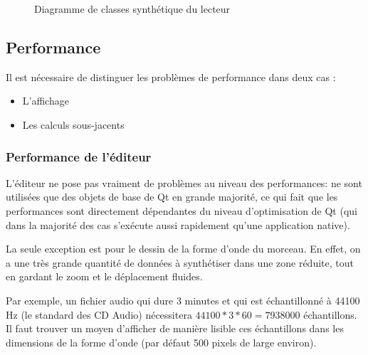 \begin{figure}[H]
\begin{center}
\caption{Diagramme de classes synthétique du lecteur}
\label{diag_player}
\end{center}
\end{figure}

\subsection{Performance}
Il est nécessaire de distinguer les problèmes de performance dans deux cas :

\begin{itemize}
	\item L'affichage
	\item Les calculs sous-jacents
\end{itemize}

\subsubsection{Performance de l'éditeur}
L'éditeur ne pose pas vraiment de problèmes au niveau des performances: ne sont utilisées que des
objets de base de Qt en grande majorité, ce qui fait que les performances sont directement dépendantes du niveau
d'optimisation de Qt (qui dans la majorité des cas s'exécute aussi rapidement qu'une application native).

La seule exception est pour le dessin de la forme d'onde du morceau. En effet, on a une très grande quantité de données à synthétiser dans
une zone réduite, tout en gardant le zoom et le déplacement fluides.

Par exemple, un fichier audio qui dure 3 minutes et qui est échantillonné à 44100 Hz (le standard des CD Audio)
nécessitera $44100 * 3 * 60 = 7938000$ échantillons. Il faut trouver un moyen d'afficher de manière lisible ces
échantillons dans les dimensions de la forme d'onde (par défaut 500 pixels de large environ).

